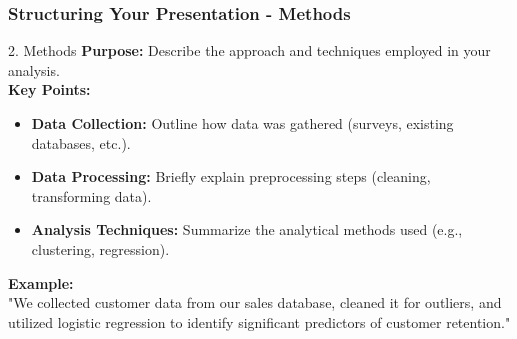 \documentclass{beamer}
\begin{document}
\begin{frame}[fragile]
    \frametitle{Structuring Your Presentation - Methods}
    \begin{block}{2. Methods}
        \textbf{Purpose:} Describe the approach and techniques employed in your analysis. 
        \\ \textbf{Key Points:}
        \begin{itemize}
            \item \textbf{Data Collection:} Outline how data was gathered (surveys, existing databases, etc.).
            \item \textbf{Data Processing:} Briefly explain preprocessing steps (cleaning, transforming data).
            \item \textbf{Analysis Techniques:} Summarize the analytical methods used (e.g., clustering, regression).
        \end{itemize}
        \textbf{Example:} 
        \\ "We collected customer data from our sales database, cleaned it for outliers, and utilized logistic regression to identify significant predictors of customer retention."
    \end{block}
\end{frame}
\end{document}
